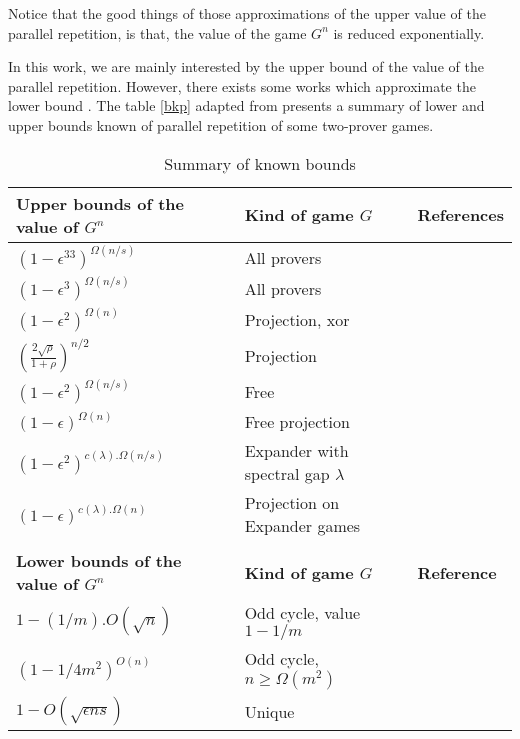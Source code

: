 Notice that the good things of those approximations of the upper value of the parallel repetition, is that,  the value of the game $G^n$ is reduced exponentially.

In this work, we are mainly interested by the upper bound of the value of the parallel repetition.  However, 
there exists some works which approximate the lower bound \citep{feige2007understanding,steurer2010improved, raz2011counterexample}. The table \eqref{bkp} adapted from \cite{tamaki2015parallel} presents a summary of lower and upper bounds known of parallel repetition of some two-prover games.

\begin{table}[h]
\begin{tabular}{lll}
\hline 
\textbf{Upper bounds of the value of $G^n$} &\textbf{ Kind of game $G$} & \textbf{References} \\ 
\hline 
$(1-\epsilon^33)^{\Omega(n/s) }$& All provers &  \cite{raz1998parallel} \\ 
$(1-\epsilon^3)^{\Omega(n/s) }$&  All provers &  \cite{holenstein2007parallel} \\ 
$(1-\epsilon^2)^{\Omega(n) }$&  Projection, xor & \cite{rao2011parallel,raz2010parallel}\\
$\left(\frac{2\sqrt{\rho}}{1+\rho} \right)^{n/2}$ & Projection & \cite{dinur2014analytical} \\
$(1-\epsilon^2)^{\Omega(n/s) }$& Free & \cite{barak2009strong}\\
$(1-\epsilon)^{\Omega(n) }$ & Free projection & \cite{barak2009strong}\\
$(1-\epsilon^2)^{c(\lambda). \Omega(n/s) }$& Expander with spectral gap $\lambda$ & \cite{raz2012strong}\\
$(1-\epsilon)^{c(\lambda). \Omega(n) }$& Projection on Expander games & \cite{raz2012strong}\\
\hline \\
\hline
\textbf{Lower bounds of the value of $G^n$} & \textbf{Kind of game $G$} & \textbf{Reference} \\ 
\hline 
$1-(1/m).{O(\sqrt{n})}$& Odd cycle, value $1-1/m$ & \cite{feige2007understanding}\\
$(1-1/4m^2)^{O(n)}$& Odd cycle, $n\geq \Omega(m^2)$ & \cite{raz2011counterexample}\\
$1-O(\sqrt{\epsilon ns})$ & Unique & \cite{steurer2010improved} \\
\hline 
\end{tabular} 
\caption{Summary of known bounds} \label{bkp}
\end{table}



